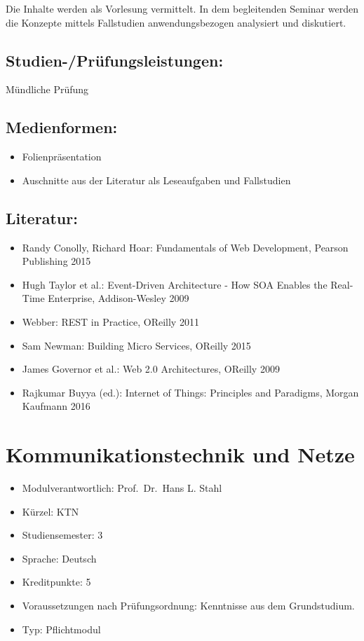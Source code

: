 Die Inhalte werden als Vorlesung vermittelt. In dem begleitenden Seminar
werden die Konzepte mittels Fallstudien anwendungsbezogen analysiert und
diskutiert.

\section*{Studien-/Prüfungsleistungen:}\label{studien-pruxfcfungsleistungen-10}

Mündliche Prüfung

\section*{Medienformen:}\label{medienformen-6}

\begin{itemize}
\tightlist
\item
  Folienpräsentation
\item
  Auschnitte aus der Literatur als Leseaufgaben und Fallstudien
\end{itemize}

\section*{Literatur:}\label{literatur-8}

\begin{itemize}
\tightlist
\item
  Randy Conolly, Richard Hoar: Fundamentals of Web Development, Pearson
  Publishing 2015
\item
  Hugh Taylor et al.: Event-Driven Architecture - How SOA Enables the
  Real-Time Enterprise, Addison-Wesley 2009
\item
  Webber: REST in Practice, OReilly 2011
\item
  Sam Newman: Building Micro Services, OReilly 2015
\item
  James Governor et al.: Web 2.0 Architectures, OReilly 2009
\item
  Rajkumar Buyya (ed.): Internet of Things: Principles and Paradigms,
  Morgan Kaufmann 2016
\end{itemize}

\chapter{Kommunikationstechnik und
Netze}\label{kommunikationstechnik-und-netze}

\begin{itemize}
\tightlist
\item
  Modulverantwortlich: Prof.~Dr.~Hans L. Stahl
\item
  Kürzel: KTN
\item
  Studiensemester: 3
\item
  Sprache: Deutsch
\item
  Kreditpunkte: 5
\item
  Voraussetzungen nach Prüfungsordnung: Kenntnisse aus dem Grundstudium.
\item
  Typ: Pflichtmodul
\end{itemize}

